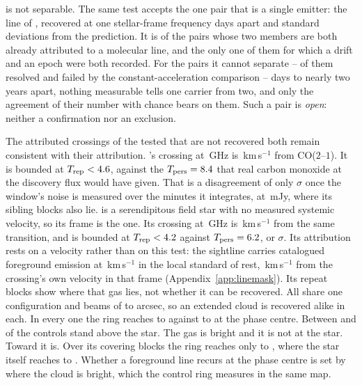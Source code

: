 is not separable. The same test accepts the one pair that is a single emitter: the
\TjCtlLine{} line of \TjCtlStar, recovered at one stellar-frame frequency
\TjCtlDtD{} days apart and \TjCtlNSig{} standard deviations from the
prediction. It is \TjNCandAttrTest{} of the \TjNCandAttr{} pairs whose two
members are both already attributed to a molecular line, and the only one of
them for which a drift and an epoch were both recorded. For the \TjNOpen{} pairs
it cannot
separate -- \TjNPowerOpen{} of them resolved and failed by the
constant-acceleration comparison -- \TjDtOpenMinD{} days to nearly two years
apart, nothing measurable tells one carrier from two, and only the agreement
of their number with chance bears on them. Such a pair is \emph{open}:
neither a confirmation nor an exclusion.

The \MkAttrExcl{} attributed crossings of the \MkAttrTested{} tested that are
not recovered both remain consistent with their attribution. \RqHrStar's crossing at \RqHrFreq\,GHz is \RqHrDv\,km\,s$^{-1}$ from
CO($2$--$1$). It is bounded at $T_{\rm rep}<4.6$, against the
$T_{\rm pers}=8.4$ that real carbon monoxide at the discovery flux
would have given. That is a disagreement of only \RqHrExcl$\sigma$ once the
window's noise is measured over the \RqHrOnsMin{} minutes it integrates, at
\RqHrRms\,mJy, where its sibling blocks also lie. \RqAjStar{} is a serendipitous field star with no measured systemic
velocity, so its frame is the \RqAjFrame{} one. Its crossing at
\RqAjFreq\,GHz is \RqAjDv\,km\,s$^{-1}$ from the same transition, and is
bounded at $T_{\rm rep}<4.2$ against $T_{\rm pers}=6.2$, or
\RqAjExcl$\sigma$. Its attribution rests
on a velocity rather than on this test: the sightline carries catalogued
foreground emission at \LsLupVco\,km\,s$^{-1}$ in the local standard of rest,
\LsLupDv\,km\,s$^{-1}$ from the crossing's own velocity in that frame
(Appendix~\ref{app:linemask}). Its repeat blocks show where that gas lies, not
whether it can be recovered. All \RqAjNRep{} share one \RqAjArray{} configuration and beams of
\RqAjBeamLo{} to \RqAjBeamHi{} arcsec, so an extended cloud is recovered
alike in each. In every one the ring reaches \RqAjCtrlLo{} to \RqAjCtrlHi{} against
\RqAjStarLo{} to \RqAjStarHi{} at the phase centre. Between \RqAjNgeLo{} and
\RqAjNgeHi{} of the \NCtrl{} controls stand above the star.
The gas is bright and it is not at the star. Toward \RqRecurCloudStars{} it is. Over its \RqCtlNBlock{} covering blocks
the ring reaches only \RqCtlRingLo{} to \RqCtlRingHi, where the star itself
reaches \RqCtlStarLo{} to \RqCtlStarHi.
Whether a foreground line recurs at the phase centre is set by where the cloud
is bright, which the control ring measures in the same map.


